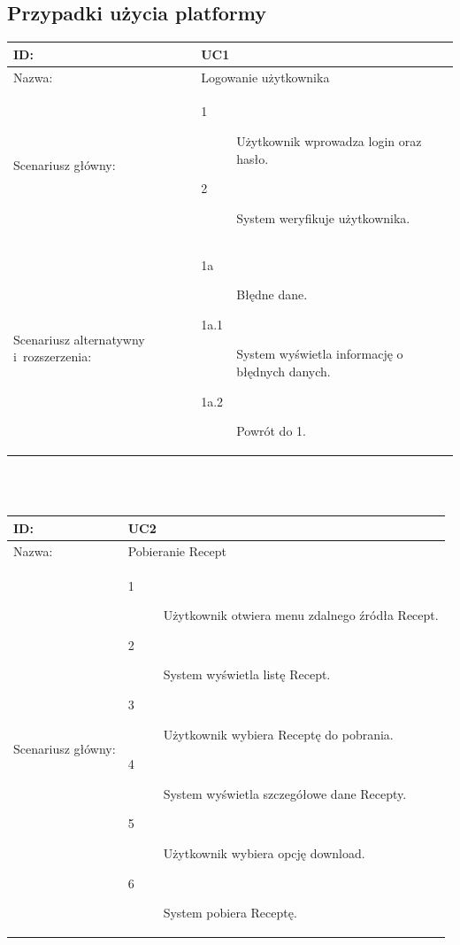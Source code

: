 \documentclass[11pt,a4paper,polish,thesis]{dcsbook}
\begin{document}
\subsection{Przypadki użycia platformy}
\begin{tabular}{|p{2.5cm}|p{11.5cm}|}  \hline ID: &
UC1
\\ \hline Nazwa: &
Logowanie użytkownika
\\ \hline Scenariusz główny: &
\begin{description}
\item[1] Użytkownik wprowadza login oraz hasło.
\item[2] System weryfikuje użytkownika.
\end{description}
\\ \hline Scenariusz alternatywny i~rozszerzenia: &
\begin{description}
\item[1a] Błędne dane.
\item[1a.1] System wyświetla informację o błędnych danych.
\item[1a.2] Powrót do 1.
\end{description}
\\ \hline \end{tabular}
\\\\ \begin{tabular}{|p{2.5cm}|p{11.5cm}|}  \hline ID: &
UC2
\\ \hline Nazwa: &
Pobieranie Recept
\\ \hline Scenariusz główny: &
\begin{description}
\item[1] Użytkownik otwiera menu zdalnego źródła Recept.
\item[2] System wyświetla listę Recept.
\item[3] Użytkownik wybiera Receptę do pobrania.
\item[4] System wyświetla szczegółowe dane Recepty.
\item[5] Użytkownik wybiera opcję download.
\item[6] System pobiera Receptę.
\end{description}
\\ \hline \end{tabular}
\end{document}
